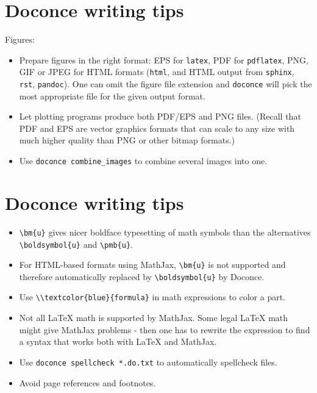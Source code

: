 \documentclass[%
twoside,                 %
final,                   %
chapterprefix=true,      %
open=right               %
10pt]{book}
\newcounter{doconce:movie:counter}
\newcounter{doconce:exercise:counter}
\begin{document}
\noindent
\section*{Doconce writing tips}


Figures:

\begin{itemize}
 \item Prepare figures in the right format: EPS for \Verb!latex!, PDF for \Verb!pdflatex!,
   PNG, GIF or JPEG for HTML formats (\Verb!html!, and HTML output from
   \Verb!sphinx!, \Verb!rst!, \Verb!pandoc!). One can omit the figure file extension and
   \Verb!doconce! will pick the most appropriate file for the given output format.

 \item Let plotting programs produce both PDF/EPS and PNG files.
   (Recall that PDF and EPS are vector graphics formats that can scale to
   any size with much higher quality than PNG or other bitmap formats.)

 \item Use \Verb!doconce combine_images! to combine several images into one.
\end{itemize}

\noindent
\section*{Doconce writing tips}

\begin{itemize}
 \item \Verb!\bm{u}! gives nicer boldface typesetting of math symbols than
   the alternatives \Verb!\boldsymbol{u}! and \Verb!\pmb{u}!.

 \item For HTML-based formats using MathJax, \Verb!\bm{u}! is not supported
   and therefore automatically replaced by \Verb!\boldsymbol{u}! by Doconce.

 \item Use \Verb!\\textcolor{blue}{formula}! in math expressions to color a part.

 \item Not all {\LaTeX} math is supported by MathJax. Some legal {\LaTeX} math
   might give MathJax problems - then one has to rewrite the expression
   to find a syntax that works both with {\LaTeX} and MathJax.

 \item Use \Verb!doconce spellcheck *.do.txt! to automatically spellcheck files.

 \item Avoid page references and footnotes.
\end{itemize}
\end{document}
